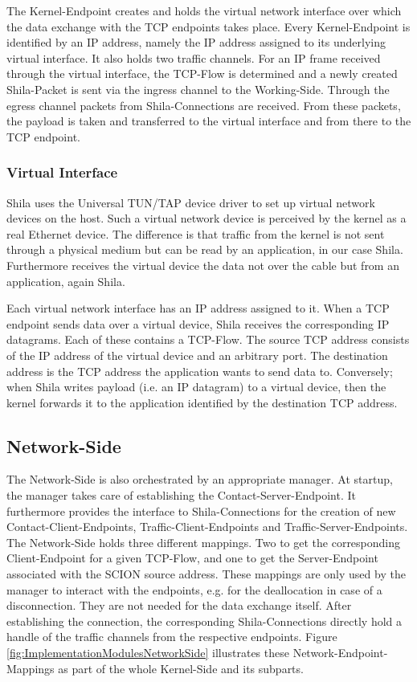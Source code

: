 The Kernel-Endpoint creates and holds the virtual network interface over which the data exchange with the TCP endpoints takes place. Every Kernel-Endpoint is identified by an IP address, namely the IP address assigned to its underlying virtual interface. It also holds two traffic channels. For an IP frame received through the virtual interface, the TCP-Flow is determined and a newly created Shila-Packet is sent via the ingress channel to the Working-Side. Through the egress channel packets from Shila-Connections are received. From these packets, the payload is taken and transferred to the virtual interface and from there to the TCP endpoint.

\subsubsection{Virtual Interface}

Shila uses the Universal TUN/TAP device driver \cite{TUNTAPDriver} to set up virtual network devices on the host. Such a virtual network device is perceived by the kernel as a real Ethernet device. The difference is that traffic from the kernel is not sent through a physical medium but can be read by an application, in our case Shila. Furthermore receives the virtual device the data not over the cable but from an application, again Shila.

Each virtual network interface has an IP address assigned to it. When a TCP endpoint sends data over a virtual device, Shila receives the corresponding IP datagrams. Each of these contains a TCP-Flow. The source TCP address consists of the IP address of the virtual device and an arbitrary port. The destination address is the TCP address the application wants to send data to. Conversely; when Shila writes payload (i.e. an IP datagram) to a virtual device, then the kernel forwards it to the application identified by the destination TCP address.  

\subsection*{Network-Side}

The Network-Side is also orchestrated by an appropriate manager. At startup, the manager takes care of establishing the Contact-Server-Endpoint. It furthermore provides the interface to Shila-Connections for the creation of new Contact-Client-Endpoints, Traffic-Client-Endpoints and Traffic-Server-Endpoints. The Network-Side holds three different mappings. Two to get the corresponding Client-Endpoint for a given TCP-Flow, and one to get the Server-Endpoint associated with the SCION source address. These mappings are only used by the manager to interact with the endpoints, e.g. for the deallocation in case of a disconnection. They are not needed for the data exchange itself. After establishing the connection, the corresponding Shila-Connections directly hold a handle of the traffic channels from the respective endpoints. Figure \ref{fig:ImplementationModulesNetworkSide} illustrates these Network-Endpoint-Mappings as part of the whole Kernel-Side and its subparts.  


